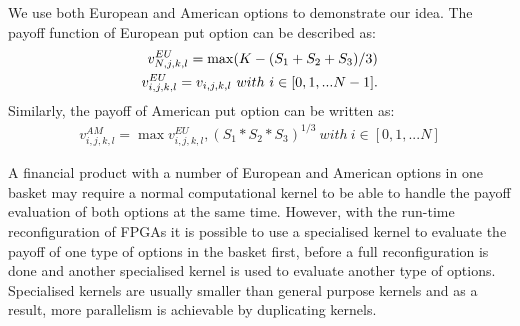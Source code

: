 \documentclass[10pt,a4paper]{article}
\begin{document}
We use both European and American options to demonstrate our idea. The payoff function of European put option can be described as:
\begin{align}
v^{EU}_{N,j,k,l} = \max(K-(S_1+S_2+S_3)/3) \notag \\
v^{EU}_{i,j,k,l} = v_{i,j,k,l} ~ with ~ i \in [0,1,...N-1] \label{eqn:payoff_eu}. 
\end{align}
Similarly, the payoff of American put option can be written as:
\begin{align}
v^{AM}_{i,j,k,l} = \max{v^{EU}_{i,j,k,l}, (S_1*S_2*S_3)^{1/3}} ~ with ~i \in [0,1,...N] \label{eqn:payoff_am}
\end{align}

A financial product with a number of European and American options in one basket may require a normal computational kernel to be able to handle the payoff evaluation of both options at the same time. However, with the run-time reconfiguration of FPGAs it is possible to use a specialised kernel to evaluate the payoff of one type of options in the basket first, before a full reconfiguration is done and another specialised kernel is used to evaluate another type of options. Specialised kernels are usually smaller than general purpose kernels and as a result, more parallelism is achievable by duplicating kernels.
\end{document}
